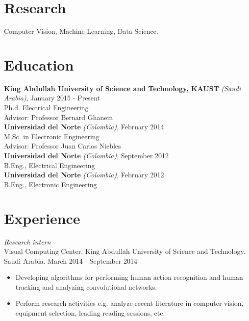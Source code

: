 \documentclass[margin]{res}
\begin{document}
 
 
 
\address{{\bf Present Address} \\ Al Khawarizmi Building (Bldg 1), 2106-WS06
          \\ Thuwal 23955-6900, Kingdom of Saudi Arabia}
\address{{\bf Contact} \\ escorciav@gmail.com - victor.escorcia@kaust.edu.sa}
 
\begin{resume} 
 
\section{Research} 
Computer Vision, Machine Learning, Data Science.


\section{Education}
\textbf{King Abdullah University of Science and Technology, KAUST}
\textit{(Saudi Arabia)}, January 2015 - Present \\
Ph.d. Electrical Engineering\\
\bigskip Advisor: Professor Bernard Ghanem\\
\textbf{Universidad del Norte} \textit{(Colombia)}, February 2014 \\
M.Sc. in Electronic Engineering\\
\bigskip Advisor: Professor Juan Carlos Niebles\\
\textbf{Universidad del Norte} \textit{(Colombia)}, September 2012 \\
B.Eng., Electrical Engineering\\
\textbf{Universidad del Norte} \textit{(Colombia)}, February 2012 \\
B.Eng., Electronic Engineering\\
 

\section{Experience}
 \textit{Research intern}\\
 Visual Computing Center, King Abdullah University of Science and Technology.
 Saudi Arabia. \hfill March 2014 - September 2014 \\
 \begin{itemize} \itemsep -2pt %
 \item Developing algorithms for performing human action recognition and human
       tracking and analyzing convolutional networks.
 \item Perform research activities e.g. analyze recent literature in computer
       vision, equipment selection, leading reading sessions, etc.
 \end{itemize}
 

\end{resume}
\end{document}
